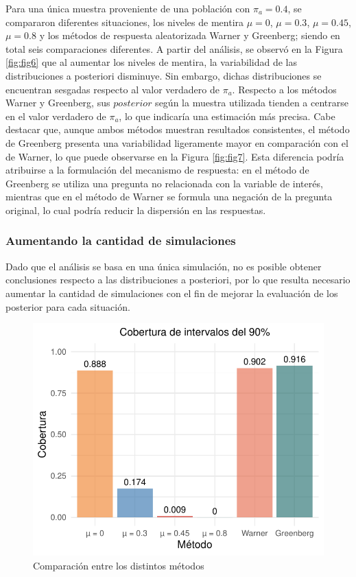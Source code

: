 \documentclass[
]{article}
\begin{document}
Para una única muestra proveniente de una población con \(\pi_a=0.4\), se compararon diferentes situaciones, los niveles de mentira \(\mu=0\), \(\mu=0.3\), \(\mu=0.45\), \(\mu=0.8\) y los métodos de respuesta aleatorizada Warner y Greenberg; siendo en total seis comparaciones diferentes. A partir del análisis, se observó en la Figura \ref{fig:fig6} que al aumentar los niveles de mentira, la variabilidad de las distribuciones a posteriori disminuye. Sin embargo, dichas distribuciones se encuentran sesgadas respecto al valor verdadero de \(\pi_a\). Respecto a los métodos Warner y Greenberg, sus \(posterior\) según la muestra utilizada tienden a centrarse en el valor verdadero de \(\pi_a\), lo que indicaría una estimación más precisa. Cabe destacar que, aunque ambos métodos muestran resultados consistentes, el método de Greenberg presenta una variabilidad ligeramente mayor en comparación con el de Warner, lo que puede observarse en la Figura \ref{fig:fig7}. Esta diferencia podría atribuirse a la formulación del mecanismo de respuesta: en el método de Greenberg se utiliza una pregunta no relacionada con la variable de interés, mientras que en el método de Warner se formula una negación de la pregunta original, lo cual podría reducir la dispersión en las respuestas.

\subsubsection{Aumentando la cantidad de simulaciones}\label{subtitulo-12}

Dado que el análisis se basa en una única simulación, no es posible obtener conclusiones respecto a las distribuciones a posteriori, por lo que resulta necesario aumentar la cantidad de simulaciones con el fin de mejorar la evaluación de los posterior para cada situación.

\begin{figure}

{\centering \includegraphics{TP-1--Bayes_files/figure-latex/fig8-1} 

}

\caption{Comparación entre los distintos métodos}\label{fig:fig8}
\end{figure}
\end{document}
